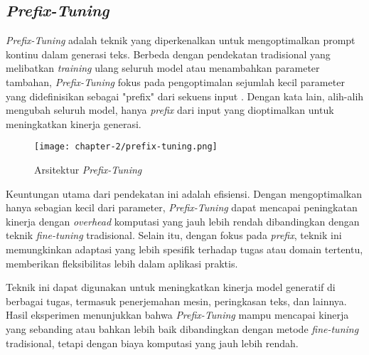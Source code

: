 \subsection{\textit{Prefix-Tuning}}

\textit{Prefix-Tuning} adalah teknik yang diperkenalkan untuk mengoptimalkan prompt kontinu dalam generasi teks. Berbeda dengan pendekatan tradisional yang melibatkan \textit{training} ulang seluruh model atau menambahkan parameter tambahan, \textit{Prefix-Tuning} fokus pada pengoptimalan sejumlah kecil parameter yang didefinisikan sebagai "prefix" dari sekuens input \parencite{prefix_tuning}. Dengan kata lain, alih-alih mengubah seluruh model, hanya \textit{prefix} dari input yang dioptimalkan untuk meningkatkan kinerja generasi.

\begin{figure}[ht]
    \centering
    \texttt{[image: chapter-2/prefix-tuning.png]}
    \caption{Arsitektur \textit{Prefix-Tuning} \parencite{prefix_tuning}}
    \label{fig:prefix-tuning}
\end{figure}

Keuntungan utama dari pendekatan ini adalah efisiensi. Dengan mengoptimalkan hanya sebagian kecil dari parameter, \textit{Prefix-Tuning} dapat mencapai peningkatan kinerja dengan \textit{overhead} komputasi yang jauh lebih rendah dibandingkan dengan teknik \textit{fine-tuning} tradisional. Selain itu, dengan fokus pada \textit{prefix}, teknik ini memungkinkan adaptasi yang lebih spesifik terhadap tugas atau domain tertentu, memberikan fleksibilitas lebih dalam aplikasi praktis.

Teknik ini dapat digunakan untuk meningkatkan kinerja model generatif di berbagai tugas, termasuk penerjemahan mesin, peringkasan teks, dan lainnya. Hasil eksperimen menunjukkan bahwa \textit{Prefix-Tuning} mampu mencapai kinerja yang sebanding atau bahkan lebih baik dibandingkan dengan metode \textit{fine-tuning} tradisional, tetapi dengan biaya komputasi yang jauh lebih rendah.

